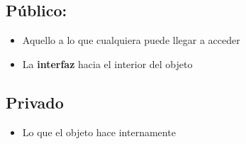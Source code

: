 \subsection{Público:}

\begin{itemize}
    \item Aquello a lo que cualquiera puede llegar a acceder
    \item La \textbf{interfaz} hacia el interior del objeto
\end{itemize}

\subsection{Privado}

\begin{itemize}
    \item Lo que el objeto hace internamente
\end{itemize}